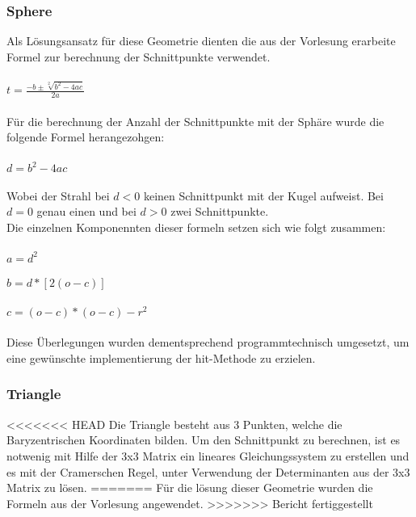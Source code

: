 \documentclass[14pt]{extarticle}
\begin{document}
\subsubsection{Sphere}
Als Lösungsansatz für diese Geometrie dienten die aus der Vorlesung erarbeite Formel zur berechnung der Schnittpunkte verwendet.
\\\\\begin{math} t=\frac{-b\pm \sqrt[2]{b^2-4ac}}{2a}\end{math}\\\\
Für die berechnung der Anzahl der Schnittpunkte mit der Sphäre wurde die folgende Formel herangezohgen:
\\\\\begin{math} d=b^2-4ac\end{math}\\\\
Wobei der Strahl bei \begin{math}d < 0\end{math} keinen Schnittpunkt mit der Kugel aufweist. Bei \begin{math}d = 0\end{math} genau einen und bei \begin{math}d > 0\end{math} zwei Schnittpunkte.\\
Die einzelnen Komponennten dieser formeln setzen sich wie folgt zusammen:\\\\
\begin{math}a=d^2\end{math}\\\\
\begin{math}b=d*[2(o-c)]\end{math}\\\\
\begin{math}c=(o-c)*(o-c)-r^2\end{math}\\\\

Diese Überlegungen wurden dementsprechend programmtechnisch umgesetzt, um eine gewünschte implementierung der hit-Methode zu erzielen.
 

\subsubsection{Triangle}
<<<<<<< HEAD
Die Triangle besteht aus 3 Punkten, welche die Baryzentrischen Koordinaten bilden. Um den Schnittpunkt zu berechnen, ist es notwenig mit Hilfe der 3x3 Matrix ein lineares Gleichungssystem zu erstellen und es mit der Cramerschen Regel, unter Verwendung der Determinanten aus der 3x3 Matrix zu lösen.
=======
Für die lösung dieser Geometrie wurden die Formeln aus der Vorlesung angewendet.
>>>>>>> Bericht fertiggestellt
\end{document}
